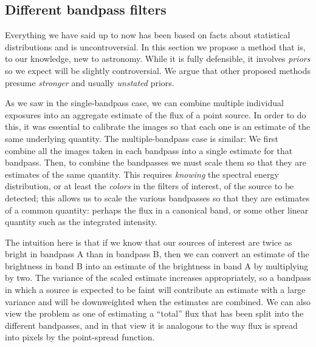 \documentclass[letterpaper,preprint]{aastex}
\begin{document}
\subsection{Different bandpass filters}

Everything we have said up to now has been based on facts about
statistical distributions and is uncontroversial.  In this section we
propose a method that is, to our knowledge, new to astronomy.  While
it is fully defensible, it involves \emph{priors} so we expect will be
slightly controversial.  We argue that other proposed methods presume
\emph{stronger} and usually \emph{unstated} priors.


As we saw in the single-bandpass case, we can combine multiple
individual exposures into an aggregate estimate of the flux of a point
source.  In order to do this, it was essential to calibrate the images
so that each one is an estimate of the same underlying quantity.  The
multiple-bandpass case is similar: We first combine all the images
taken in each bandpass into a single estimate for that bandpass.
Then, to combine the bandpasses we must scale them so that they are
estimates of the same quantity.  This requires \emph{knowing} the
spectral energy distribution, or at least the \emph{colors} in the
filters of interest, of the source to be detected; this allows us to
scale the various bandpasses so that they are estimates of a common
quantity: perhaps the flux in a canonical band, or some other linear
quantity such as the integrated intensity.



The intuition here is that if we know that our sources of interest are
twice as bright in bandpass A than in bandpass B, then we can convert
an estimate of the brightness in band B into an estimate of the
brightness in band A by multiplying by two.  The variance of the
scaled estimate increases appropriately, so a bandpass in which a
source is expected to be faint will contribute an estimate with a
large variance and will be downweighted when the estimates are
combined.  We can also view the problem as one of estimating a
``total'' flux that has been split into the different bandpasses, and
in that view it is analogous to the way flux is spread into pixels by
the point-spread function.

\newcommand{\sigdj}{\sigma_{j}}
\end{document}
